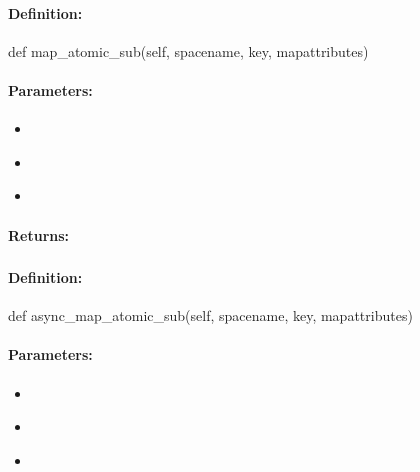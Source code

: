 \paragraph{Definition:}
\begin{pythoncode}
def map_atomic_sub(self, spacename, key, mapattributes)
\end{pythoncode}

\paragraph{Parameters:}
\begin{itemize}[noitemsep]
\item {}\\

\item {}\\

\item {}\\

\end{itemize}

\paragraph{Returns:}


\pagebreak
\subsubsection{}
\label{api:python:async_map_atomic_sub}


\paragraph{Definition:}
\begin{pythoncode}
def async_map_atomic_sub(self, spacename, key, mapattributes)
\end{pythoncode}

\paragraph{Parameters:}
\begin{itemize}[noitemsep]
\item {}\\

\item {}\\

\item {}\\

\end{itemize}

